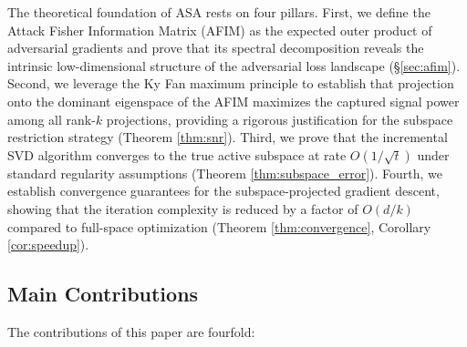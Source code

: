 ﻿\documentclass[lettersize,journal]{IEEEtran}
\begin{document}
The theoretical foundation of ASA rests on four pillars. First, we define the Attack Fisher Information Matrix (AFIM) as the expected outer product of adversarial gradients and prove that its spectral decomposition reveals the intrinsic low-dimensional structure of the adversarial loss landscape (\S\ref{sec:afim}). Second, we leverage the Ky Fan maximum principle \cite{fan1949theorem} to establish that projection onto the dominant eigenspace of the AFIM maximizes the captured signal power among all rank-$k$ projections, providing a rigorous justification for the subspace restriction strategy (Theorem \ref{thm:snr}). Third, we prove that the incremental SVD algorithm converges to the true active subspace at rate $O(1/\sqrt{t})$ under standard regularity assumptions (Theorem \ref{thm:subspace_error}). Fourth, we establish convergence guarantees for the subspace-projected gradient descent, showing that the iteration complexity is reduced by a factor of $O(d/k)$ compared to full-space optimization (Theorem \ref{thm:convergence}, Corollary \ref{cor:speedup}).

\subsection{Main Contributions}
\label{sec:contributions}

The contributions of this paper are fourfold:
\end{document}

